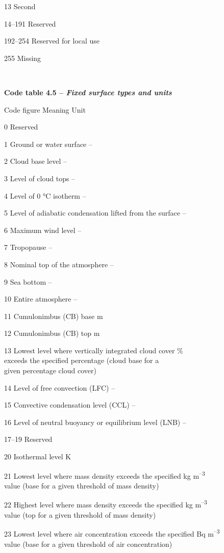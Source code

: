 13 Second

14--191 Reserved

192--254 Reserved for local use

255 Missing

\textbf{\\
}

\textbf{Code table 4.5 -- \emph{Fixed surface types and units}}

Code figure Meaning Unit

0 Reserved

1 Ground or water surface --

2 Cloud base level --

3 Level of cloud tops --

4 Level of 0 °C isotherm --

5 Level of adiabatic condensation lifted from the surface --

6 Maximum wind level --

7 Tropopause --

8 Nominal top of the atmosphere --

9 Sea bottom --

10 Entire atmosphere --

11 Cumulonimbus (CB) base m

12 Cumulonimbus (CB) top m

13 Lowest level where vertically integrated cloud cover \%\\
exceeds the specified percentage (cloud base for a\\
given percentage cloud cover)

14 Level of free convection (LFC) --

15 Convective condensation level (CCL) --

16 Level of neutral buoyancy or equilibrium level (LNB) --

17--19 Reserved

20 Isothermal level K

21 Lowest level where mass density exceeds the specified kg m\textsuperscript{--3}\\
value (base for a given threshold of mass density)

22 Highest level where mass density exceeds the specified kg m\textsuperscript{--3}\\
value (top for a given threshold of mass density)

23 Lowest level where air concentration exceeds the specified Bq m\textsuperscript{--3}\\
value (base for a given threshold of air concentration)

